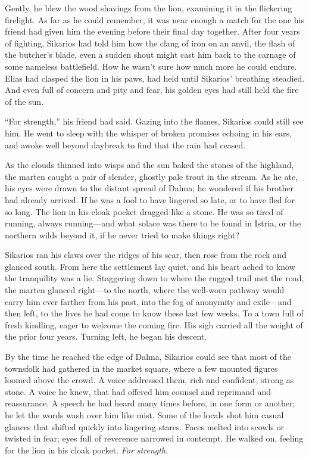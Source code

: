 Gently, he blew the wood shavings from the lion, examining it in the flickering firelight. As far as he could remember, it was near enough a match for the one his friend had given him the evening before their final day together. After four years of fighting, Sikarios had told him how the clang of iron on an anvil, the flash of the butcher's blade, even a sudden shout might cast him back to the carnage of some nameless battlefield. How he wasn't sure how much more he could endure. Elias had clasped the lion in his paws, had held until Sikarios' breathing steadied. And even full of concern and pity and fear, his golden eyes had still held the fire of the sun.

``For strength,'' his friend had said. Gazing into the flames, Sikarios could still see him. He went to sleep with the whisper of broken promises echoing in his ears, and awoke well beyond daybreak to find that the rain had ceased.

As the clouds thinned into wisps and the sun baked the stones of the highland, the marten caught a pair of slender, ghostly pale trout in the stream. As he ate, his eyes were drawn to the distant spread of Dalma; he wondered if his brother had already arrived. If he was a fool to have lingered so late, or to have fled for so long. The lion in his cloak pocket dragged like a stone. He was so tired of running, always running---and what solace was there to be found in Istria, or the northern wilds beyond it, if he never tried to make things right?

Sikarios ran his claws over the ridges of his scar, then rose from the rock and glanced south. From here the settlement lay quiet, and his heart ached to know the tranquility was a lie. Staggering down to where the rugged trail met the road, the marten glanced right---to the north, where the well-worn pathway would carry him ever farther from his past, into the fog of anonymity and exile---and then left, to the lives he had come to know these last few weeks. To a town full of fresh kindling, eager to welcome the coming fire. His sigh carried all the weight of the prior four years. Turning left, he began his descent.

By the time he reached the edge of Dalma, Sikarios could see that most of the townsfolk had gathered in the market square, where a few mounted figures loomed above the crowd. A voice addressed them, rich and confident, strong as stone. A voice he knew, that had offered him counsel and reprimand and reassurance. A speech he had heard many times before, in one form or another; he let the words wash over him like mist. Some of the locals shot him casual glances that shifted quickly into lingering stares. Faces melted into scowls or twisted in fear; eyes full of reverence narrowed in contempt. He walked on, feeling for the lion in his cloak pocket. \emph{For strength}.

